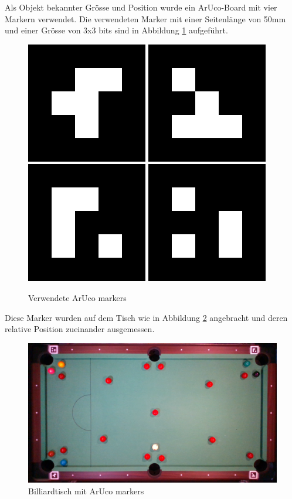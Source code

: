 Als Objekt bekannter Grösse und Position wurde ein ArUco-Board \cite{opencv:detection_of_aruco_boards} mit vier Markern verwendet.
Die verwendeten Marker mit einer Seitenlänge von 50\si{\milli\metre} und einer Grösse von 3x3 bits sind
in Abbildung \ref{fig:used_aruco_markers} aufgeführt.

\begin{figure}[h!]
    \includegraphics[width=0.2\linewidth]{../common/resources/aruco/marker_0.png}
    \includegraphics[width=0.2\linewidth]{../common/resources/aruco/marker_1.png}
    \includegraphics[width=0.2\linewidth]{../common/resources/aruco/marker_2.png}
    \includegraphics[width=0.2\linewidth]{../common/resources/aruco/marker_3.png}
    \caption{Verwendete ArUco markers}
    \label{fig:used_aruco_markers}
\end{figure}

Diese Marker wurden auf dem Tisch wie in Abbildung \ref{fig:table_with_aruco_markers} angebracht und deren relative
Position zueinander ausgemessen.

\begin{figure}[h!]
    \begin{center}
    \includegraphics[width=0.6\linewidth]{../common/resources/coordinate_systems/table_with_markers.png}
    \end{center}
    \caption{Billiardtisch mit ArUco markers}
    \label{fig:table_with_aruco_markers}
\end{figure}


